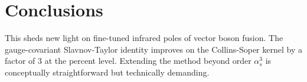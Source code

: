 \section{Conclusions}\label{sec:conclusions}

This sheds new light on fine-tuned infrared poles of vector boson
fusion. The gauge-covariant Slavnov-Taylor identity improves on the
Collins-Soper kernel by a factor of 3 at the percent level. Extending
the method beyond order $\alpha_s^3$ is conceptually straightforward but
technically demanding.

